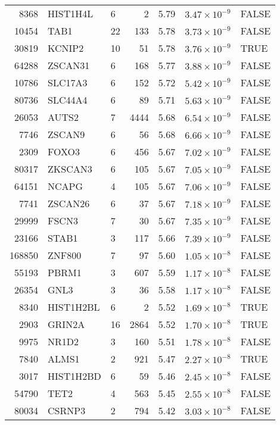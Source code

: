 \begin{table}[ht]
\begin{adjustbox}{totalheight=10in}
\begin{tabular}{rllrrrl}
  8368 & HIST1H4L & 6 &   2 & 5.79 & $3.47 \times 10^{-9}$ & FALSE \\ 
  10454 & TAB1 & 22 & 133 & 5.78 & $3.73 \times 10^{-9}$ & FALSE \\ 
  30819 & KCNIP2 & 10 &  51 & 5.78 & $3.76 \times 10^{-9}$ & TRUE \\ 
  64288 & ZSCAN31 & 6 & 168 & 5.77 & $3.88 \times 10^{-9}$ & FALSE \\ 
  10786 & SLC17A3 & 6 & 152 & 5.72 & $5.42 \times 10^{-9}$ & FALSE \\ 
  80736 & SLC44A4 & 6 &  89 & 5.71 & $5.63 \times 10^{-9}$ & FALSE \\ 
  26053 & AUTS2 & 7 & 4444 & 5.68 & $6.54 \times 10^{-9}$ & FALSE \\ 
  7746 & ZSCAN9 & 6 &  56 & 5.68 & $6.66 \times 10^{-9}$ & FALSE \\ 
  2309 & FOXO3 & 6 & 456 & 5.67 & $7.02 \times 10^{-9}$ & FALSE \\ 
  80317 & ZKSCAN3 & 6 & 105 & 5.67 & $7.05 \times 10^{-9}$ & FALSE \\ 
  64151 & NCAPG & 4 & 105 & 5.67 & $7.06 \times 10^{-9}$ & FALSE \\ 
  7741 & ZSCAN26 & 6 &  37 & 5.67 & $7.18 \times 10^{-9}$ & FALSE \\ 
  29999 & FSCN3 & 7 &  30 & 5.67 & $7.35 \times 10^{-9}$ & FALSE \\ 
  23166 & STAB1 & 3 & 117 & 5.66 & $7.39 \times 10^{-9}$ & FALSE \\ 
  168850 & ZNF800 & 7 &  97 & 5.60 & $1.05 \times 10^{-8}$ & FALSE \\ 
  55193 & PBRM1 & 3 & 607 & 5.59 & $1.17 \times 10^{-8}$ & FALSE \\ 
  26354 & GNL3 & 3 &  36 & 5.58 & $1.17 \times 10^{-8}$ & FALSE \\ 
  8340 & HIST1H2BL & 6 &   2 & 5.52 & $1.69 \times 10^{-8}$ & TRUE \\ 
  2903 & GRIN2A & 16 & 2864 & 5.52 & $1.70 \times 10^{-8}$ & TRUE \\ 
  9975 & NR1D2 & 3 & 160 & 5.51 & $1.78 \times 10^{-8}$ & FALSE \\ 
  7840 & ALMS1 & 2 & 921 & 5.47 & $2.27 \times 10^{-8}$ & TRUE \\ 
  3017 & HIST1H2BD & 6 &  59 & 5.46 & $2.45 \times 10^{-8}$ & FALSE \\ 
  54790 & TET2 & 4 & 563 & 5.45 & $2.55 \times 10^{-8}$ & FALSE \\ 
  80034 & CSRNP3 & 2 & 794 & 5.42 & $3.03 \times 10^{-8}$ & FALSE \\ 

\end{tabular}
\end{adjustbox}
\end{table}
